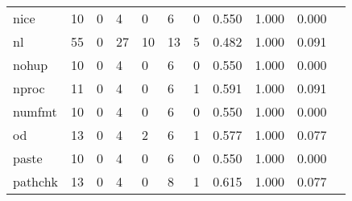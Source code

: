 \begin{longtable}{lp{1.10cm}p{1.10cm}p{1.10cm}p{1.10cm}p{1.10cm}p{1.10cm}p{1.10cm}p{1.10cm}p{1.10cm}p{1.10cm}}
nice      &                     10 &                                  0 &                                 4 &                                0 &                                 6 &                               0 &                          0.550 &                                 1.000 &                               0.000 \\
nl        &                     55 &                                  0 &                                27 &                               10 &                                13 &                               5 &                          0.482 &                                 1.000 &                               0.091 \\
nohup     &                     10 &                                  0 &                                 4 &                                0 &                                 6 &                               0 &                          0.550 &                                 1.000 &                               0.000 \\
nproc     &                     11 &                                  0 &                                 4 &                                0 &                                 6 &                               1 &                          0.591 &                                 1.000 &                               0.091 \\
numfmt    &                     10 &                                  0 &                                 4 &                                0 &                                 6 &                               0 &                          0.550 &                                 1.000 &                               0.000 \\
od        &                     13 &                                  0 &                                 4 &                                2 &                                 6 &                               1 &                          0.577 &                                 1.000 &                               0.077 \\
paste     &                     10 &                                  0 &                                 4 &                                0 &                                 6 &                               0 &                          0.550 &                                 1.000 &                               0.000 \\
pathchk   &                     13 &                                  0 &                                 4 &                                0 &                                 8 &                               1 &                          0.615 &                                 1.000 &                               0.077 \\

\end{longtable}
